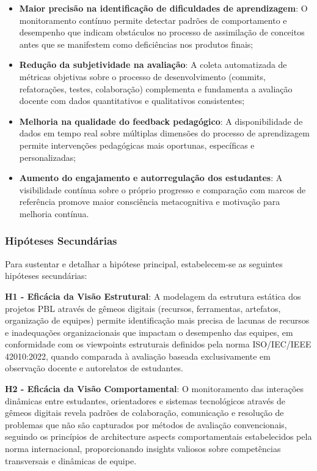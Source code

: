 \documentclass[12pt, a4paper, oneside]{abntex2}
\begin{document}
\begin{itemize}
\item \textbf{Maior precisão na identificação de dificuldades de aprendizagem}: O monitoramento contínuo permite detectar padrões de comportamento e desempenho que indicam obstáculos no processo de assimilação de conceitos antes que se manifestem como deficiências nos produtos finais;

\item \textbf{Redução da subjetividade na avaliação}: A coleta automatizada de métricas objetivas sobre o processo de desenvolvimento (commits, refatorações, testes, colaboração) complementa e fundamenta a avaliação docente com dados quantitativos e qualitativos consistentes;

\item \textbf{Melhoria na qualidade do feedback pedagógico}: A disponibilidade de dados em tempo real sobre múltiplas dimensões do processo de aprendizagem permite intervenções pedagógicas mais oportunas, específicas e personalizadas;

\item \textbf{Aumento do engajamento e autorregulação dos estudantes}: A visibilidade contínua sobre o próprio progresso e comparação com marcos de referência promove maior consciência metacognitiva e motivação para melhoria contínua.
\end{itemize}

\subsubsection{Hipóteses Secundárias}

Para sustentar e detalhar a hipótese principal, estabelecem-se as seguintes hipóteses secundárias:

\textbf{H1 - Eficácia da Visão Estrutural}: A modelagem da estrutura estática dos projetos PBL através de gêmeos digitais (recursos, ferramentas, artefatos, organização de equipes) permite identificação mais precisa de lacunas de recursos e inadequações organizacionais que impactam o desempenho das equipes, em conformidade com os viewpoints estruturais definidos pela norma ISO/IEC/IEEE 42010:2022, quando comparada à avaliação baseada exclusivamente em observação docente e autorelatos de estudantes.

\textbf{H2 - Eficácia da Visão Comportamental}: O monitoramento das interações dinâmicas entre estudantes, orientadores e sistemas tecnológicos através de gêmeos digitais revela padrões de colaboração, comunicação e resolução de problemas que não são capturados por métodos de avaliação convencionais, seguindo os princípios de architecture aspects comportamentais estabelecidos pela norma internacional, proporcionando insights valiosos sobre competências transversais e dinâmicas de equipe.
\end{document}

